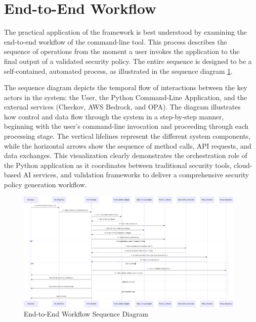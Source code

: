 \section{End-to-End Workflow}

The practical application of the framework is best understood by examining the end-to-end workflow of the command-line tool. This process describes the sequence of operations from the moment a user invokes the application to the final output of a validated security policy. The entire sequence is designed to be a self-contained, automated process, as illustrated in the sequence diagram \ref{fig:e2e_workflow}.

The sequence diagram depicts the temporal flow of interactions between the key actors in the system: the User, the Python Command-Line Application, and the external services (Checkov, AWS Bedrock, and OPA). The diagram illustrates how control and data flow through the system in a step-by-step manner, beginning with the user's command-line invocation and proceeding through each processing stage. The vertical lifelines represent the different system components, while the horizontal arrows show the sequence of method calls, API requests, and data exchanges. This visualization clearly demonstrates the orchestration role of the Python application as it coordinates between traditional security tools, cloud-based AI services, and validation frameworks to deliver a comprehensive security policy generation workflow.

\begin{landscape}
\thispagestyle{empty}
\begin{figure}[p]
\centering
\includegraphics[width=0.9\linewidth,height=0.7\textheight,keepaspectratio]{Figures/image.pdf}
\caption{End-to-End Workflow Sequence Diagram}
\label{fig:e2e_workflow}
\end{figure}
\end{landscape}

